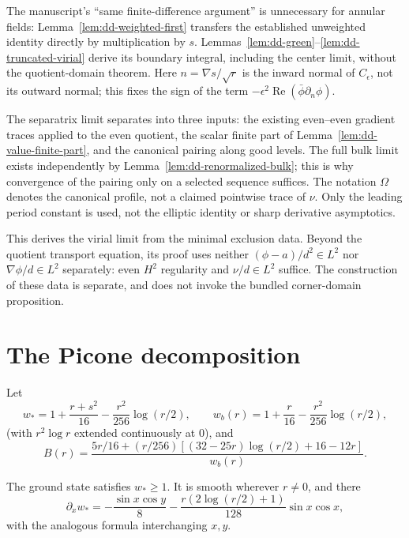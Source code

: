 \begin{remark}
The manuscript's ``same finite-difference argument'' is unnecessary for
annular fields: Lemma~\ref{lem:dd-weighted-first} transfers the established
unweighted identity directly by multiplication by $s$.
Lemmas~\ref{lem:dd-green}--\ref{lem:dd-truncated-virial} derive its boundary
integral, including the center limit, without the quotient-domain theorem.
Here $n=\nabla s/\sqrt r$ is the inward normal of $C_\epsilon$, not its
outward normal; this fixes the sign of the term
$-\epsilon^2\operatorname{Re}(\bar\phi\partial_n\phi)$.

The separatrix limit separates into three inputs: the existing even--even
gradient traces applied to the even quotient, the scalar finite part of
Lemma~\ref{lem:dd-value-finite-part}, and the canonical pairing along good
levels. The full bulk limit exists independently by
Lemma~\ref{lem:dd-renormalized-bulk}; this is why convergence of the pairing
only on a selected sequence suffices. The notation $\Omega$ denotes the
canonical profile, not a claimed pointwise trace of $\nu$.
Only the leading period constant is used, not the elliptic identity or
sharp derivative asymptotics.

This derives the virial limit from the minimal exclusion data.
Beyond the quotient transport equation, its proof uses neither
$(\phi-a)/d^2\in L^2$ nor $\nabla\phi/d\in L^2$ separately: even $H^2$
regularity and $\nu/d\in L^2$ suffice. The construction of these data is
separate, and does not invoke the bundled corner-domain proposition.
\end{remark}

\section{The Picone decomposition}

\begin{definition}
\label{def:dd-ground-state}
\leanok
Let
\[
  w_*=1+\frac{r+s^2}{16}-\frac{r^2}{256}\log(r/2),\qquad
  w_b(r)=1+\frac r{16}-\frac{r^2}{256}\log(r/2),
\]
(with $r^2\log r$ extended continuously at $0$), and
\[
  B(r)=\frac{5r/16+(r/256)[(32-25r)\log(r/2)+16-12r]}{w_b(r)}.
\]
\end{definition}

\begin{lemma}
\label{lem:dd-ground-first-order}
\leanok
The ground state satisfies $w_*\ge1$. It is smooth wherever $r\ne0$,
and there
\[
 \partial_xw_*=-\frac{\sin x\cos y}{8}
   -\frac{r(2\log(r/2)+1)}{128}\sin x\cos x,
\]
with the analogous formula interchanging $x,y$.
\end{lemma}


